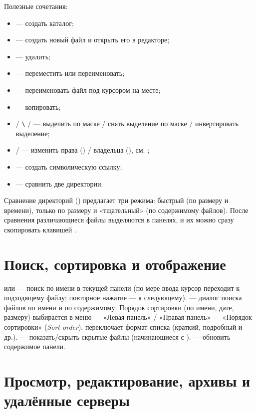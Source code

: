 Полезные сочетания:
\begin{itemize}
  \item {} --- создать каталог;
  \item {} --- создать новый файл и открыть его
    в редакторе;
  \item {} --- удалить;
  \item {} --- переместить или переименовать;
  \item {} --- переименовать файл под курсором
    на месте;
  \item {} --- копировать;
  \item \cmd{+} / \texttt{\textbackslash} / \cmd{*} --- выделить
    по маске / снять выделение по маске / инвертировать
    выделение;
  \item {} /  --- изменить права
    () / владельца (), см.
    ;
  \item {} --- создать символическую ссылку;
  \item {} --- сравнить две директории.
\end{itemize}

Сравнение директорий () предлагает три режима:
быстрый (по размеру и времени), только по размеру и
«тщательный» (по содержимому файлов). После сравнения
различающиеся файлы выделяются в панелях, и их можно
сразу скопировать клавишей .

\section{Поиск, сортировка и отображение}

 или  --- поиск по имени в текущей
панели (по мере ввода курсор переходит к подходящему файлу;
повторное нажатие --- к следующему).  --- диалог
поиска файлов по имени и по содержимому. Порядок сортировки
(по имени, дате, размеру) выбирается в меню  ---
«Левая панель» / «Правая панель» --- «Порядок сортировки»
(\emph{Sort order}).  переключает формат списка
(краткий, подробный и др.).  --- показать/скрыть
скрытые файлы (начинающиеся с ).  ---
обновить содержимое панели.

\section{Просмотр, редактирование, архивы и удалённые серверы}

